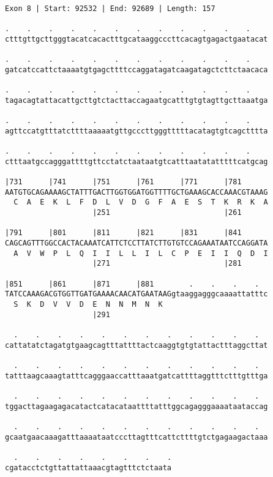 \documentclass{article}
\begin{document}
\begin{Verbatim}[fontfamily=courier]
Exon 8 | Start: 92532 | End: 92689 | Length: 157

.    .    .    .    .    .    .    .    .    .    .    .    
ctttgttgcttgggtacatcacactttgcataaggcccttcacagtgagactgaatacat

.    .    .    .    .    .    .    .    .    .    .    .    
gatcatccattctaaaatgtgagcttttccaggatagatcaagatagctcttctaacaca

.    .    .    .    .    .    .    .    .    .    .    .    
tagacagtattacattgcttgtctacttaccagaatgcatttgtgtagttgcttaaatga

.    .    .    .    .    .    .    .    .    .    .    .    
agttccatgtttatcttttaaaaatgttgcccttgggtttttacatagtgtcagctttta

.    .    .    .    .    .    .    .    .    .    .    .    
ctttaatgccagggattttgttcctatctaataatgtcatttaatatatttttcatgcag

|731      |741      |751      |761      |771      |781      
AATGTGCAGAAAAGCTATTTGACTTGGTGGATGGTTTTGCTGAAAGCACCAAACGTAAAG
  C  A  E  K  L  F  D  L  V  D  G  F  A  E  S  T  K  R  K  A
                    |251                          |261      

|791      |801      |811      |821      |831      |841      
CAGCAGTTTGGCCACTACAAATCATTCTCCTTATCTTGTGTCCAGAAATAATCCAGGATA
  A  V  W  P  L  Q  I  I  L  L  I  L  C  P  E  I  I  Q  D  I
                    |271                          |281      

|851      |861      |871      |881        .    .    .    .  
TATCCAAAGACGTGGTTGATGAAAACAACATGAATAAGgtaaggagggcaaaattatttc
  S  K  D  V  V  D  E  N  N  M  N  K                        
                    |291                                    

  .    .    .    .    .    .    .    .    .    .    .    .  
cattatatctagatgtgaagcagtttattttactcaaggtgtgtattactttaggcttat

  .    .    .    .    .    .    .    .    .    .    .    .  
tatttaagcaaagtatttcagggaaccatttaaatgatcattttaggtttctttgtttga

  .    .    .    .    .    .    .    .    .    .    .    .  
tggacttagaagagacatactcatacataattttatttggcagagggaaaataataccag

  .    .    .    .    .    .    .    .    .    .    .    .  
gcaatgaacaaagatttaaaataatcccttagtttcattcttttgtctgagaagactaaa

  .    .    .    .    .    .    .    .
cgatacctctgttattattaaacgtagtttctctaata
\end{Verbatim}
\end{document}
